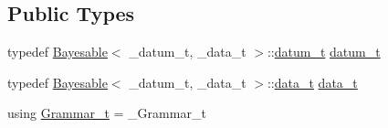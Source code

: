 \subsection*{Public Types}
\begin{DoxyCompactItemize}
\item 
typedef \hyperlink{class_bayesable}{Bayesable}$<$ \+\_\+datum\+\_\+t, \+\_\+data\+\_\+t $>$\+::\hyperlink{class_l_o_t_hypothesis_ae36b1f113f45ee5ac82660028672739b}{datum\+\_\+t} \hyperlink{class_l_o_t_hypothesis_ae36b1f113f45ee5ac82660028672739b}{datum\+\_\+t}
\item 
typedef \hyperlink{class_bayesable}{Bayesable}$<$ \+\_\+datum\+\_\+t, \+\_\+data\+\_\+t $>$\+::\hyperlink{class_l_o_t_hypothesis_abd9c848100dfaaf2870f5dfa9ea91c65}{data\+\_\+t} \hyperlink{class_l_o_t_hypothesis_abd9c848100dfaaf2870f5dfa9ea91c65}{data\+\_\+t}
\item 
using \hyperlink{class_l_o_t_hypothesis_a8006204013d471860e54c49d19edbace}{Grammar\+\_\+t} = \+\_\+\+Grammar\+\_\+t
\end{DoxyCompactItemize}

